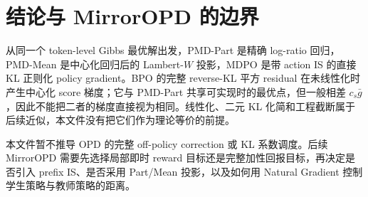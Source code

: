 \chapter{结论与 MirrorOPD 的边界}
\label{ch:conclusion}

从同一个 token-level Gibbs 最优解出发，PMD-Part 是精确 log-ratio 回归，PMD-Mean 是中心化回归后的 Lambert-$W$ 投影，MDPO 是带 action IS 的直接 KL 正则化 policy gradient。BPO 的完整 reverse-KL 平方 residual 在未线性化时产生中心化 score 梯度；它与 PMD-Part 共享可实现时的最优点，但一般相差 $c_s\bar g$，因此不能把二者的梯度直接视为相同。线性化、二元 KL 化简和工程截断属于后续近似，本文件没有把它们作为理论等价的前提。

本文件暂不推导 OPD 的完整 off-policy correction 或 KL 系数调度。后续 MirrorOPD 需要先选择局部即时 reward 目标还是完整加性回报目标，再决定是否引入 prefix IS、是否采用 Part/Mean 投影，以及如何用 Natural Gradient 控制学生策略与教师策略的距离。
